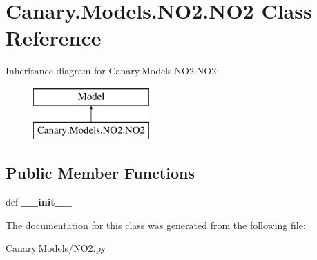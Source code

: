 \hypertarget{class_canary_8_models_1_1_n_o2_1_1_n_o2}{\section{Canary.\-Models.\-N\-O2.\-N\-O2 Class Reference}
\label{class_canary_8_models_1_1_n_o2_1_1_n_o2}
}
Inheritance diagram for Canary.\-Models.\-N\-O2.\-N\-O2\-:\begin{figure}[H]
\begin{center}
\leavevmode
\includegraphics[height=2.000000cm]{class_canary_8_models_1_1_n_o2_1_1_n_o2}
\end{center}
\end{figure}
\subsection*{Public Member Functions}
\begin{DoxyCompactItemize}
\item 
\hypertarget{class_canary_8_models_1_1_n_o2_1_1_n_o2_a4edf36a92eac9b90349c3de7c0495c5f}{def {\bfseries \-\_\-\-\_\-init\-\_\-\-\_\-}}\label{class_canary_8_models_1_1_n_o2_1_1_n_o2_a4edf36a92eac9b90349c3de7c0495c5f}

\end{DoxyCompactItemize}


The documentation for this class was generated from the following file\-:\begin{DoxyCompactItemize}
\item 
Canary.\-Models/N\-O2.\-py\end{DoxyCompactItemize}
